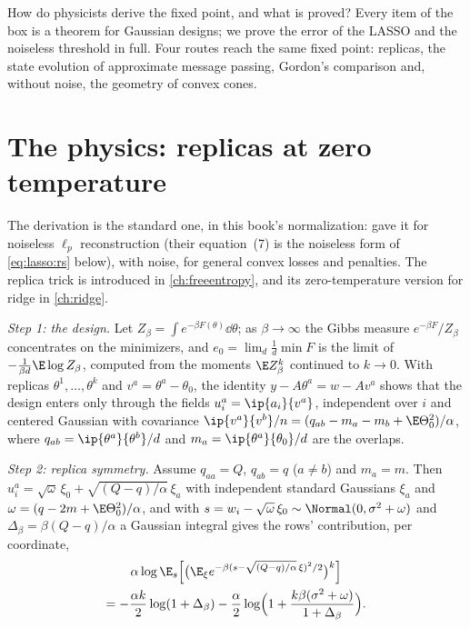 \begin{refsection}
How do physicists derive the fixed point, and what is proved? Every item of the box is a theorem for Gaussian designs; we prove the error of the LASSO and the noiseless threshold in full. Four routes reach the same fixed point: replicas, the state evolution of approximate message passing, Gordon's comparison and, without noise, the geometry of convex cones.

\section{The physics: replicas at zero temperature}\label{sec:lasso:physics}

The derivation is the standard one, in this book's normalization: \textcite{KabashimaEtAl2009} gave it for noiseless $\ell_p$ reconstruction (their equation~(7) is the noiseless form of \eqref{eq:lasso:rs} below), \textcite{RanganFletcherGoyal2012} with noise, \textcite{AdvaniGanguli2016} for general convex losses and penalties. The replica trick is introduced in \cref{ch:freeentropy}, and its zero-temperature version for ridge in \cref{ch:ridge}.

\begin{heuristic}
\emph{Step 1: the design.} Let $Z_\beta=\int e^{-\beta F(\theta)}\dd\theta$; as $\beta\to\infty$ the Gibbs measure $e^{-\beta F}/Z_\beta$ concentrates on the minimizers, and $e_0=\lim_d\frac1d\min F$ is the limit of $-\frac1{\beta d}\E\log Z_\beta$, computed from the moments $\E Z_\beta^k$ continued to $k\to0$. With replicas $\theta^1,\dots,\theta^k$ and $v^a=\theta^a-\theta_0$, the identity $y-A\theta^a=w-Av^a$ shows that the design enters only through the fields $u_i^a=\ip{a_i}{v^a}$, independent over $i$ and centered Gaussian with covariance $\ip{v^a}{v^b}/n=(q_{ab}-m_a-m_b+\E\Theta_0^2)/\alpha$, where $q_{ab}=\ip{\theta^a}{\theta^b}/d$ and $m_a=\ip{\theta^a}{\theta_0}/d$ are the overlaps.

\emph{Step 2: replica symmetry.} Assume $q_{aa}=Q$, $q_{ab}=q$ ($a\ne b$) and $m_a=m$. Then $u_i^a=\sqrt\omega\,\xi_0+\sqrt{(Q-q)/\alpha}\,\xi_a$ with independent standard Gaussians $\xi_a$ and $\omega=(q-2m+\E\Theta_0^2)/\alpha$, and with $s=w_i-\sqrt\omega\,\xi_0\sim\Normal(0,\sigma^2+\omega)$ and $\Delta_\beta=\beta(Q-q)/\alpha$ a Gaussian integral gives the rows' contribution, per coordinate,
\begin{multline*}
\alpha\log\E_s\Bigl[\bigl(\E_\xi e^{-\beta(s-\sqrt{(Q-q)/\alpha}\,\xi)^2/2}\bigr)^k\Bigr]\\
=-\frac{\alpha k}2\log(1+\Delta_\beta)-\frac\alpha2\log\Bigl(1+\frac{k\beta(\sigma^2+\omega)}{1+\Delta_\beta}\Bigr).
\end{multline*}


\end{heuristic}
\end{refsection}
